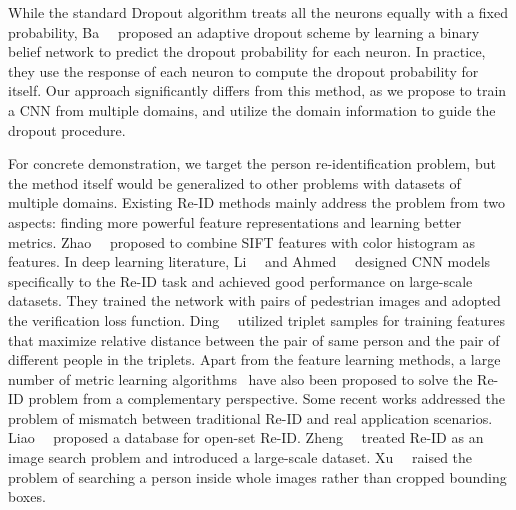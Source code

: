 While the standard Dropout algorithm treats all the neurons equally with a fixed probability, Ba~\etal~\cite{ba2013adaptive} proposed an adaptive dropout scheme by learning a binary belief network to predict the dropout probability for each neuron. In practice, they use the response of each neuron to compute the dropout probability for itself. Our approach significantly differs from this method, as we propose to train a CNN from multiple domains, and utilize the domain information to guide the dropout procedure.

For concrete demonstration, we target the person re-identification problem, but the method itself would be generalized to other problems with datasets of multiple domains. Existing Re-ID methods mainly address the problem from two aspects: finding more powerful feature representations and learning better metrics. Zhao~\etal~\cite{zhao2013unsupervised,zhao2013person,zhao2014learning} proposed to combine SIFT features with color histogram as features. In deep learning literature, Li~\etal~\cite{li2014deepreid} and Ahmed~\etal~\cite{ahmed2015improved} designed CNN models specifically to the Re-ID task and achieved good performance on large-scale datasets. They trained the network with pairs of pedestrian images and adopted the verification loss function. Ding~\etal~\cite{ding2015deep} utilized triplet samples for training features that maximize relative distance between the pair of same person and the pair of different people in the triplets. Apart from the feature learning methods, a large number of metric learning algorithms~\cite{paisitkriangkrai2015learning,weinberger2005distance,xiong2014person,davis2007information,mcfee2010metric,koestinger2012large} have also been proposed to solve the Re-ID problem from a complementary perspective. Some recent works addressed the problem of mismatch between traditional Re-ID and real application scenarios. Liao~\etal~\cite{liao2014open} proposed a database for open-set Re-ID. Zheng~\etal~\cite{zheng2015scalable} treated Re-ID as an image search problem and introduced a large-scale dataset. Xu~\etal~\cite{xu2014person} raised the problem of searching a person inside whole images rather than cropped bounding boxes.

